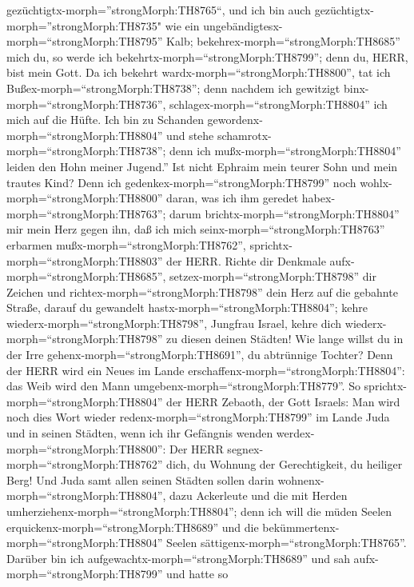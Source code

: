 gezüchtigtx-morph=''strongMorph:TH8765``, und ich bin auch
gezüchtigtx-morph=''strongMorph:TH8735" wie ein
ungebändigtesx-morph=``strongMorph:TH8795'' Kalb;
bekehrex-morph=``strongMorph:TH8685'' mich du, so werde ich
bekehrtx-morph=``strongMorph:TH8799''; denn du, HERR, bist mein Gott.
 Da ich bekehrt wardx-morph=``strongMorph:TH8800'', tat ich
Bußex-morph=``strongMorph:TH8738''; denn nachdem ich gewitzigt
binx-morph=``strongMorph:TH8736'', schlagex-morph=``strongMorph:TH8804''
ich mich auf die Hüfte. Ich bin zu Schanden
gewordenx-morph=``strongMorph:TH8804'' und stehe
schamrotx-morph=``strongMorph:TH8738''; denn ich
mußx-morph=``strongMorph:TH8804'' leiden den Hohn meiner Jugend.''
 Ist nicht Ephraim mein teurer Sohn und mein trautes Kind?
Denn ich gedenkex-morph=``strongMorph:TH8799'' noch
wohlx-morph=``strongMorph:TH8800'' daran, was ich ihm geredet
habex-morph=``strongMorph:TH8763''; darum
brichtx-morph=``strongMorph:TH8804'' mir mein Herz gegen ihn, daß ich
mich seinx-morph=``strongMorph:TH8763'' erbarmen
mußx-morph=``strongMorph:TH8762'', sprichtx-morph=``strongMorph:TH8803''
der HERR.  Richte dir Denkmale
aufx-morph=``strongMorph:TH8685'', setzex-morph=``strongMorph:TH8798''
dir Zeichen und richtex-morph=``strongMorph:TH8798'' dein Herz auf die
gebahnte Straße, darauf du gewandelt hastx-morph=``strongMorph:TH8804'';
kehre wiederx-morph=``strongMorph:TH8798'', Jungfrau Israel, kehre dich
wiederx-morph=``strongMorph:TH8798'' zu diesen deinen Städten!
 Wie lange willst du in der Irre
gehenx-morph=``strongMorph:TH8691'', du abtrünnige Tochter? Denn der
HERR wird ein Neues im Lande erschaffenx-morph=``strongMorph:TH8804'':
das Weib wird den Mann umgebenx-morph=``strongMorph:TH8779''.
 So sprichtx-morph=``strongMorph:TH8804'' der HERR Zebaoth,
der Gott Israels: Man wird noch dies Wort wieder
redenx-morph=``strongMorph:TH8799'' im Lande Juda und in seinen Städten,
wenn ich ihr Gefängnis wenden werdex-morph=``strongMorph:TH8800'': Der
HERR segnex-morph=``strongMorph:TH8762'' dich, du Wohnung der
Gerechtigkeit, du heiliger Berg!  Und Juda samt allen
seinen Städten sollen darin wohnenx-morph=``strongMorph:TH8804'', dazu
Ackerleute und die mit Herden umherziehenx-morph=``strongMorph:TH8804'';
 denn ich will die müden Seelen
erquickenx-morph=``strongMorph:TH8689'' und die
bekümmertenx-morph=``strongMorph:TH8804'' Seelen
sättigenx-morph=``strongMorph:TH8765''.  Darüber bin ich
aufgewachtx-morph=``strongMorph:TH8689'' und sah
aufx-morph=``strongMorph:TH8799'' und hatte so
